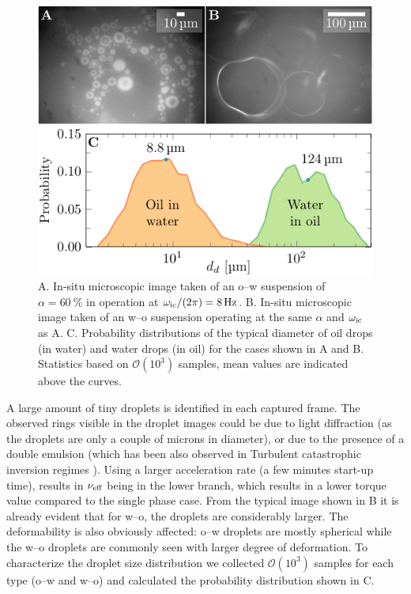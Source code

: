 \begin{figure}
\centering
\includegraphics{dropletCombined.pdf}
\caption{A. In-situ microscopic image taken of an o--w suspension of
$\alpha=\SI{60}{\percent}$ in operation at $\omega_\text{ic}/(2\pi)=\SI{8}{\hertz}$. B.
In-situ microscopic image taken of an w--o suspension operating at the same
$\alpha$ and $\omega_\text{ic}$ as A. C. Probability distributions of the typical
diameter of oil drops (in water) and water drops (in oil) for the cases shown
in A and B. Statistics based on $\mathcal{O}(10^3)$ samples, mean values are
indicated above the curves.}
\label{fig:dropletsize}
\end{figure}%
%
A large amount of tiny droplets is identified in each captured frame. The observed rings visible in the droplet images could be due to light diffraction  (as the droplets are only a couple of microns in diameter), or due to the presence of a double emulsion (which has been also observed in Turbulent catastrophic inversion regimes \cite{Piela2008}).
Using a larger acceleration rate (a few minutes start-up time), results in $\nu_\text{eff}$ being in
the lower branch, which results in a lower torque value compared to the single phase case. From the typical image shown in B it is
already evident that for w--o, the droplets are considerably larger. The deformability is also obviously affected: o--w droplets are mostly spherical while the w--o droplets are commonly seen with larger degree of deformation. 
To characterize the droplet size distribution we collected $\mathcal{O}(10^3)$ samples for each type (o--w and w--o) and 
calculated the probability distribution shown in C.
